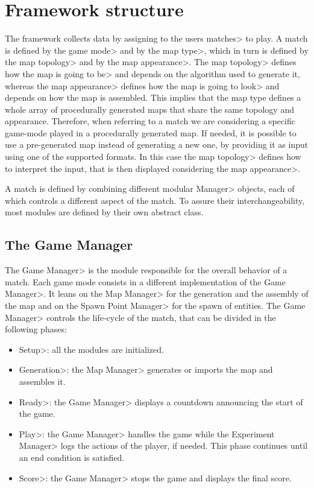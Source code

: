 
\section{Framework structure}

The framework collects data by assigning to the users \<matches> to play. A match is defined by the \<game mode> and by the \<map type>, which in turn is defined by the \<map topology> and by the \<map appearance>. The \<map topology> defines how the map is going to \<be> and depends on the algorithm used to generate it, whereas the \<map appearance> defines how the map is going to \<look> and depends on how the map is assembled. This implies that the map type defines a whole array of procedurally generated maps that share the same topology and appearance. Therefore, when referring to a match we are considering a specific game-mode played in a procedurally generated map. If needed, it is possible to use a pre-generated map instead of generating a new one, by providing it as input using one of the supported formats. In this case the \<map topology> defines how to interpret the input, that is then displayed considering the \<map appearance>.

\par

A match is defined by combining different modular \<Manager> objects, each of which controls a different aspect of the match. To assure their interchangeability, most modules are defined by their own abstract class.


\subsection{The Game Manager}

The \<Game Manager> is the module responsible for the overall behavior of a match. Each game mode consists in a different implementation of the \<Game Manager>. It leans on the \<Map Manager> for the generation and the assembly of the map and on the \<Spawn Point Manager> for the spawn of entities. The \<Game Manager> controls the life-cycle of the match, that can be divided in the following phases:

\begin{itemize}
\item \<Setup>: all the modules are initialized.
\item \<Generation>: the \<Map Manager> generates or imports the map and assembles it.
\item \<Ready>: the \<Game Manager> displays a countdown announcing the start of the game.
\item \<Play>: the \<Game Manager> handles the game while the \<Experiment Manager> logs the actions of the player, if needed. This phase continues until an end condition is satisfied.
\item \<Score>: the \<Game Manager> stops the game and displays the final score.
\end{itemize}

